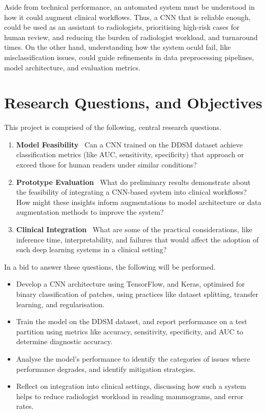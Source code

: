 \documentclass[main]{subfiles}
\begin{document}
Aside from technical performance, an automated system must be understood in how it could augment clinical workflows. Thus, a CNN that is reliable enough, could be used as an assistant to radiologists, prioritising high-risk cases for human review, and reducing the burden of radiologist workload, and turnaround times. On the other hand, understanding how the system oculd fail, like misclassification issues, could guide refinements in data preprocessing pipelines, model architecture, and evaluation metrics.

\section{Research Questions, and Objectives}
\label{sec:intro_research_questions}
This project is comprised of the following, central research questions.

\begin{enumerate}
	\item \textbf{Model Feasibility} \textemdash\ Can a CNN trained on the DDSM dataset achieve classification metrics (like AUC, sensitivity, specificity) that approach or exceed those for human readers under similar conditions?
	\item \textbf{Prototype Evaluation} \textemdash\ What do preliminary results demonstrate about the feasibility of integrating a CNN-based system into clinical workflows? How might these insights inform augmentations to model architecture or data augmentation methods to improve the system?
	\item \textbf{Clinical Integration} \textemdash\ What are some of the practical considerations, like inference time, interpretability, and failures that would affect the adoption of such deep learning systems in a clinical setting?
\end{enumerate}

In a bid to answer these questions, the following will be performed.

\begin{itemize}
	\item Develop a CNN architecture using TensorFlow, and Keras, optimised for binary classification of patches, using practices like dataset splitting, transfer learning, and regularisation.
	\item Train the model on the DDSM dataset, and report performance on a test partition using metrics like accuracy, sensitivity, specificity, and AUC to determine diagnostic accuracy.
	\item Analyse the model's performance to identify the categories of issues where performance degrades, and identify mitigation strategies.
	\item Reflect on integration into clinical settings, discussing how such a system helps to reduce radiologist workload in reading mammograms, and error rates.
\end{itemize}
\end{document}
